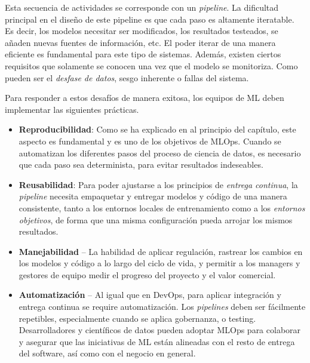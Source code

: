 \documentclass[
  12pt,
  a4paperpaper,
]{report}
\begin{document}
Esta secuencia de actividades se corresponde con un \emph{pipeline}. La
dificultad principal en el diseño de este pipeline es que cada paso es
altamente iteratable. Es decir, los modelos necesitar ser modificados,
los resultados testeados, se añaden nuevas fuentes de información, etc.
El poder iterar de una manera eficiente es fundamental para este tipo de
sistemas. Además, existen ciertos requisitos que solamente se conocen
una vez que el modelo se monitoriza. Como pueden ser el \emph{desfase de
datos}, sesgo inherente o fallas del sistema.

Para responder a estos desafíos de manera exitosa, los equipos de ML
deben implementar las siguientes prácticas.

\begin{itemize}
\item
  \textbf{Reproducibilidad}: Como se ha explicado en al principio del
  capítulo, este aspecto es fundamental y es uno de los objetivos de
  MLOps. Cuando se automatizan los diferentes pasos del proceso de
  ciencia de datos, es necesario que cada paso sea determinista, para
  evitar resultados indeseables.
\item
  \textbf{Reusabilidad}: Para poder ajustarse a los principios de
  \emph{entrega continua}, la \emph{pipeline} necesita empaquetar y
  entregar modelos y código de una manera consistente, tanto a los
  entornos locales de entrenamiento como a los \emph{entornos
  objetivos}, de forma que una misma configuración pueda arrojar los
  mismos resultados.
\item
  \textbf{Manejabilidad} -- La habilidad de aplicar regulación, rastrear
  los cambios en los modelos y código a lo largo del ciclo de vida, y
  permitir a los managers y gestores de equipo medir el progreso del
  proyecto y el valor comercial.
\item
  \textbf{Automatización} -- Al igual que en DevOps, para aplicar
  integración y entrega continua se require automatización. Los
  \emph{pipelines} deben ser fácilmente repetibles, especialmente cuando
  se aplica gobernanza, o testing. Desarrolladores y científicos de
  datos pueden adoptar MLOps para colaborar y asegurar que las
  iniciativas de ML están alineadas con el resto de entrega del
  software, así como con el negocio en general.
\end{itemize}
\end{document}
